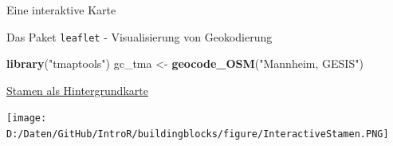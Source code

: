 \documentclass[ignorenonframetext,]{beamer}
\newenvironment{Shaded}{\begin{snugshade}}{\end{snugshade}}
\newcommand{\KeywordTok}[1]{\textcolor[rgb]{0.26,0.66,0.93}{\textbf{#1}}}
\newcommand{\DataTypeTok}[1]{\textcolor[rgb]{0.74,0.68,0.62}{\underline{#1}}}
\newcommand{\FloatTok}[1]{\textcolor[rgb]{0.27,0.67,0.26}{#1}}
\newcommand{\StringTok}[1]{\textcolor[rgb]{0.02,0.61,0.04}{#1}}
\newcommand{\OperatorTok}[1]{\textcolor[rgb]{0.74,0.68,0.62}{#1}}
\newcommand{\NormalTok}[1]{\textcolor[rgb]{0.74,0.68,0.62}{#1}}
\begin{document}
\begin{frame}[fragile]{Eine interaktive Karte}

\begin{Shaded}
\end{Shaded}

\end{frame}

\begin{frame}[fragile]{Das Paket \texttt{leaflet} - Visualisierung von
Geokodierung}

\begin{Shaded}
\begin{Highlighting}[]
\KeywordTok{library}\NormalTok{(}\StringTok{"tmaptools"}\NormalTok{)}
\NormalTok{gc_tma <-}\StringTok{ }\KeywordTok{geocode_OSM}\NormalTok{(}\StringTok{"Mannheim, GESIS"}\NormalTok{)}
\end{Highlighting}
\end{Shaded}

\begin{Shaded}
\end{Shaded}

\end{frame}

\begin{frame}[fragile]{\href{https://rstudio.github.io/leaflet/basemaps.html}{Stamen
als Hintergrundkarte}}

\begin{Shaded}
\end{Shaded}

\texttt{[image: D:/Daten/GitHub/IntroR/buildingblocks/figure/InteractiveStamen.PNG]}

\end{frame}
\end{document}

